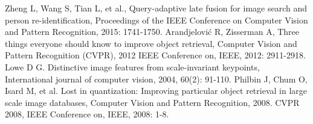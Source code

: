 \documentclass{article}
\begin{document}
	
	\begin{thebibliography}{99}  
	Zheng L, Wang S, Tian L, et al., Query-adaptive late fusion for image search and person re-identification, Proceedings of the IEEE Conference on Computer Vision and Pattern Recognition, 2015: 1741-1750.  
	Arandjelović R, Zisserman A, Three things everyone should know to improve object retrieval, Computer Vision and Pattern Recognition (CVPR), 2012 IEEE Conference on, IEEE, 2012: 2911-2918.  
	Lowe D G. Distinctive image features from scale-invariant keypoints, International journal of computer vision, 2004, 60(2): 91-110.  
	Philbin J, Chum O, Isard M, et al. Lost in quantization: Improving particular object retrieval in large scale image databases, Computer Vision and Pattern Recognition, 2008. CVPR 2008, IEEE Conference on, IEEE, 2008: 1-8.  
	\end{thebibliography}
\end{document}
